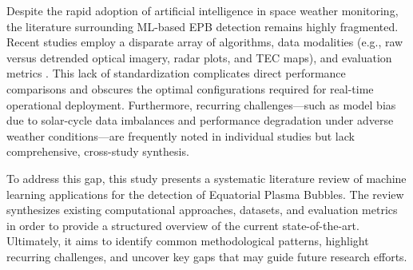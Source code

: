 Despite the rapid adoption of artificial intelligence in space weather monitoring, the literature surrounding ML-based EPB detection remains highly fragmented. Recent studies employ a disparate array of algorithms, data modalities (e.g., raw versus detrended optical imagery, radar plots, and TEC maps), and evaluation metrics \cite{okoh2025bootstrapping}. This lack of standardization complicates direct performance comparisons and obscures the optimal configurations required for real-time operational deployment. Furthermore, recurring challenges---such as model bias due to solar-cycle data imbalances and performance degradation under adverse weather conditions---are frequently noted in individual studies but lack comprehensive, cross-study synthesis.

To address this gap, this study presents a systematic literature review of machine learning applications for the detection of Equatorial Plasma Bubbles. The review synthesizes existing computational approaches, datasets, and evaluation metrics in order to provide a structured overview of the current state-of-the-art. Ultimately, it aims to identify common methodological patterns, highlight recurring challenges, and uncover key gaps that may guide future research efforts.